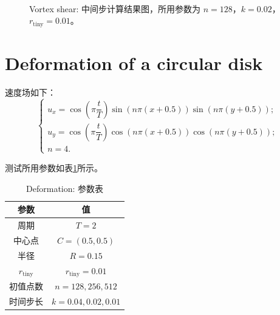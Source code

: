 \documentclass[a4paper,twoside]{ctexart}
\begin{document}
\begin{figure}[h]
{    }\\
    \caption{Vortex shear: 中间步计算结果图，所用参数为 $n=128$，$k=0.02$，$r_\mathrm{tiny}=0.01$。}
    \label{fig:vortex}
\end{figure}

\section{Deformation of a circular disk}

速度场如下：
\begin{equation}
  \left\{
    \begin{array}{l}
      u_x=\cos\left(\pi \dfrac{t}{T}\right)\sin(n\pi(x+0.5))\sin(n\pi(y+0.5));\\
      u_y=\cos\left(\pi \dfrac{t}{T}\right)\cos(n\pi(x+0.5))\cos(n\pi(y+0.5));\\
      n=4.
    \end{array}
  \right.
\end{equation}

测试所用参数如表\ref{tab:deformation1}所示。
\begin{table}[htbp]
    \centering\begin{tabular}{c|c}
        \hline
        参数&值\\
        \hline
        周期&$T=2$\\
        中心点&$C=(0.5,0.5)$\\
        半径&$R=0.15$\\
        $r_{\mathrm{tiny}}$&$r_{\mathrm{tiny}}=0.01$\\
        初值点数&$n=128,256,512$\\
        时间步长&$k=0.04,0.02,0.01$\\
        \hline
    \end{tabular}
    \caption{Deformation: 参数表}
    \label{tab:deformation1}
\end{table}
\end{document}
